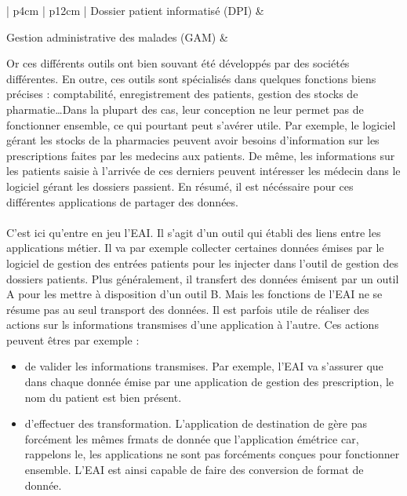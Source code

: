 			\begin{tabular}{| p{4cm} | p{12cm} |} %
				\hline
					Dossier patient informatisé (DPI)
					&
					
				\hline
					Gestion administrative des malades (GAM)
					&
				
				\hline
			\end{tabular}
			
			Or ces différents outils ont bien souvant été développés par des sociétés
			différentes. En outre, ces outils sont spécialisés dans quelques fonctions
			biens précises : comptabilité, enregistrement des patients, gestion des
			stocks de pharmatie\ldots Dans la plupart des cas, leur conception ne leur
			permet pas de fonctionner ensemble, ce qui pourtant peut s'avérer utile. Par
			exemple, le logiciel gérant les stocks de la pharmacies peuvent avoir besoins
			d'information sur les prescriptions faites par les medecins aux patients. De
			même, les informations sur les patients saisie à l'arrivée de ces derniers
			peuvent intéresser les médecin dans le logiciel gérant les dossiers passient.
			En résumé, il est nécéssaire pour ces différentes applications de partager
			des données.
		
			\paragraph{}%
			C'est ici qu'entre en jeu l'EAI. Il s'agit d'un outil qui établi des liens
			entre les applications métier. Il va par exemple collecter certaines données
			émises par le logiciel de gestion des entrées patients pour les injecter dans
			l'outil de gestion des dossiers patients. Plus généralement, il transfert des données
			émisent par un outil A pour les mettre à disposition d'un outil B.\newline
			Mais les fonctions de l'EAI ne se résume pas au seul transport des
			données. Il est parfois utile de réaliser des actions sur ls informations
			transmises d'une application à l'autre. Ces actions peuvent êtres par exemple
			:\newline
			\begin{itemize}
			  \item de valider les informations transmises. Par exemple, l'EAI va
			  s'assurer que dans chaque donnée émise par une application de gestion des
			  prescription, le nom du patient est bien présent.
			  \item d'effectuer des transformation. L'application de destination de
			  gère pas forcément les mêmes frmats de donnée que l'application émétrice
			  car, rappelons le, les applications ne sont pas forcéments conçues pour
			  fonctionner ensemble. L'EAI est ainsi capable de faire des conversion de
			  format de donnée.
			\end{itemize}

